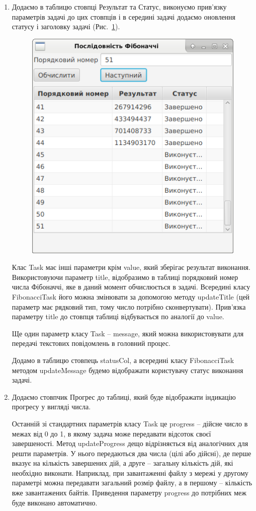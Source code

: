 \begin{enumerate}
	\item Додаємо в таблицю стовпці Результат та Статус, виконуємо прив’язку параметрів задачі до цих стовпців і в середині задачі додаємо оновлення статусу і заголовку задачі (Рис.~\ref{fig:image5}).

	\begin{figure}[h]
		\includegraphics{chapter21/images/image5.png}
		\caption{}
		\label{fig:image5}
	\end{figure}

	Клас Task має інші параметри крім value, який зберігає результат виконання. Використовуючи параметр title, відобразимо в таблиці порядковий номер числа Фібоначчі, яке в даний момент обчислюється в задачі. Всередині класу FibonacciTask його можна змінювати за допомогою методу updateTitle (цей параметр має рядковий тип, тому число потрібно сконвертувати). Прив'язка параметру title до стовпця таблиці відбувається по аналогії до value.

	Ще один параметр класу Task – message, який можна використовувати для передачі текстових повідомлень в головний процес. 

	Додамо в таблицю стовпець statusCol, а всередині класу FibonacciTask методом updateMessage будемо відображати користувачу статус виконання задачі.

	\item Додаємо стовпчик Прогрес до таблиці, який буде відображати індикацію прогресу у вигляді числа.

	Останній зі стандартних параметрів класу Task це progress – дійсне число в межах від 0 до 1, в якому задача може передавати відсоток своєї завершеності. Метод updateProgress дещо відрізняється від аналогічних для решти параметрів. У нього передаються два числа (цілі або дійсні), де перше вказує на кількість завершених дій, а друге – загальну кількість дій, які необхідно виконати. Наприклад, при завантаженні файлу з мережі у другому параметрі можна передавати загальний розмір файлу, а в першому – кількість вже завантажених байтів. Приведення параметру progress до потрібних меж буде виконано автоматично.


\end{enumerate}
